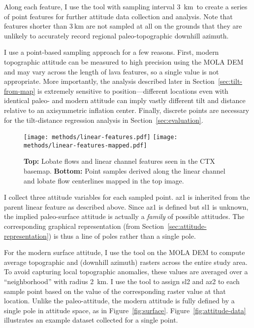 \newcommand{\samplinginterval}{\qty{3}{\km}}

Along each feature, I use the  tool with sampling interval \samplinginterval\ to create a series of point features for further attitude data collection and analysis. Note that features shorter than $\samplinginterval$ are not sampled at all on the grounds that they are unlikely to accurately record regional paleo-topographic downhill azimuth.

I use a point-based sampling approach for a few reasons. First, modern topographic attitude can be measured to high precision using the \ac{MOLA} \ac{DEM} and may vary across the length of lava features, so a single value is not appropriate. More importantly, the analysis described later in Section~\ref{sec:tilt-from-map} is extremely sensitive to position---different locations even with identical paleo- and modern attitude can imply vastly different tilt and distance relative to an axisymmetric inflation center. Finally, discrete points are necessary for the tilt-distance regression analysis in Section~\ref{sec:evaluation}.

\begin{figure}
    \texttt{[image: methods/linear-features.pdf]}
    \texttt{[image: methods/linear-features-mapped.pdf]}
    \caption[Mapping linear features]{\textbf{Top:} Lobate flows and linear channel features seen in the \acs{CTX} basemap. \textbf{Bottom:} Point samples derived along the linear channel and lobate flow centerlines mapped in the top image.}%
    \label{fig:linear-features}
\end{figure}

\newcommand{\neighborhood}{\qty{2}{\km}}

I collect three attitude variables for each sampled point. \Acf{az1} is inherited from the parent linear feature as described above. Since \ac{az1} is defined but \acf{sl1} is unknown, the implied paleo-surface attitude is actually a \emph{family} of possible attitudes. The corresponding graphical representation (from Section~\ref{sec:attitude-representation}) is thus a line of poles rather than a single pole.

For the modern surface attitude, I use the  tool on the \ac{MOLA} \ac{DEM} to compute average topographic  and  (downhill azimuth) rasters across the entire study area. To avoid capturing local topographic anomalies, these values are averaged over a ``neighborhood'' with radius \neighborhood. I use the  tool to assign \acf{sl2} and \acf{az2} to each sample point based on the value of the corresponding raster value at that location. Unlike the paleo-attitude, the modern attitude is fully defined by a single pole in attitude space, as in Figure~\ref{fig:surface}. Figure~\ref{fig:attitude-data} illustrates an example dataset collected for a single point.

